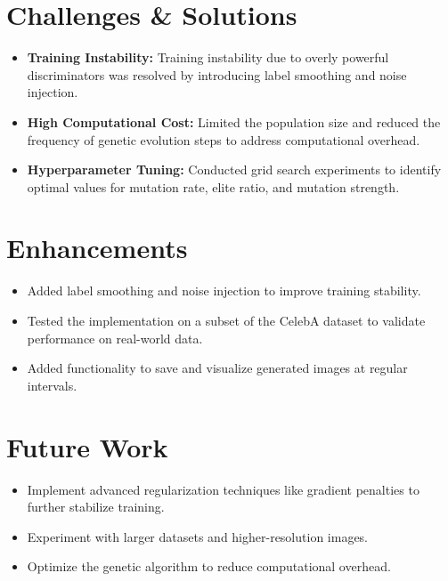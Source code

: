 \documentclass[12pt]{article}
\begin{document}
\section*{Challenges \& Solutions}
\begin{itemize}
    \item \textbf{Training Instability:} Training instability due to overly powerful discriminators was resolved by introducing label smoothing and noise injection.
    \item \textbf{High Computational Cost:} Limited the population size and reduced the frequency of genetic evolution steps to address computational overhead.
    \item \textbf{Hyperparameter Tuning:} Conducted grid search experiments to identify optimal values for mutation rate, elite ratio, and mutation strength.
\end{itemize}

\section*{Enhancements}
\begin{itemize}
    \item Added label smoothing and noise injection to improve training stability.
    \item Tested the implementation on a subset of the CelebA dataset to validate performance on real-world data.
    \item Added functionality to save and visualize generated images at regular intervals.
\end{itemize}

\section*{Future Work}
\begin{itemize}
    \item Implement advanced regularization techniques like gradient penalties to further stabilize training.
    \item Experiment with larger datasets and higher-resolution images.
    \item Optimize the genetic algorithm to reduce computational overhead.
\end{itemize}
\end{document}
